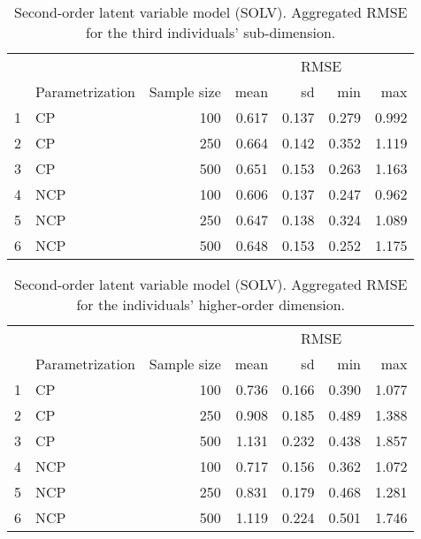 %
\begin{table}[H]
	\centering
	\begin{tabular}{rlrrrrr}
		\hline
		\multicolumn{3}{c}{ } &\multicolumn{4}{c}{ RMSE } \\ 
		\cmidrule(rl){4-7}
		& Parametrization & Sample size & mean & sd & min & max \\  
		\hline\hline
		1 & CP &  100 & 0.617 & 0.137 & 0.279 & 0.992 \\  
		2 & CP &  250 & 0.664 & 0.142 & 0.352 & 1.119 \\  
		3 & CP &  500 & 0.651 & 0.153 & 0.263 & 1.163 \\ 
		\hline
		4 & NCP &  100 & 0.606 & 0.137 & 0.247 & 0.962 \\ 
		5 & NCP &  250 & 0.647 & 0.138 & 0.324 & 1.089 \\ 
		6 & NCP &  500 & 0.648 & 0.153 & 0.252 & 1.175 \\   
		\hline
	\end{tabular}
	\caption[Second-order latent variable model (SOLV). Aggregated RMSE for the third individuals' sub-dimension.]%
	{Second-order latent variable model (SOLV). Aggregated RMSE for the third individuals' sub-dimension.}
	\label{tab:SOLV_RMSE_theta3}
\end{table}
%
\begin{table}[H]
	\centering
	\begin{tabular}{rlrrrrr}
		\hline
		\multicolumn{3}{c}{ } & \multicolumn{4}{c}{ RMSE } \\ 
		\cmidrule(rl){4-7}
		& Parametrization & Sample size & mean & sd & min & max \\  
		\hline\hline
		1 & CP &  100 & 0.736 & 0.166 & 0.390 & 1.077 \\ 
		2 & CP &  250 & 0.908 & 0.185 & 0.489 & 1.388 \\
		3 & CP &  500 & 1.131 & 0.232 & 0.438 & 1.857 \\ 
		\hline
		4 & NCP &  100 & 0.717 & 0.156 & 0.362 & 1.072 \\  
		5 & NCP &  250 & 0.831 & 0.179 & 0.468 & 1.281 \\
		6 & NCP &  500 & 1.119 & 0.224 & 0.501 & 1.746 \\   
		\hline
	\end{tabular}
	\caption[Second-order latent variable model (SOLV). Aggregated RMSE for the individuals' higher-order dimension.]%
	{Second-order latent variable model (SOLV). Aggregated RMSE for the individuals' higher-order dimension.}
	\label{tab:SOLV_RMSE_theta}
\end{table}
